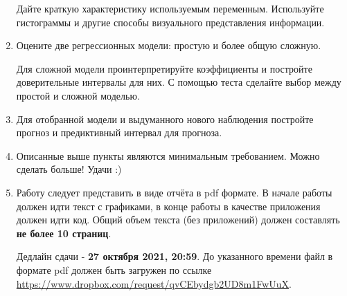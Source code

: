 \documentclass[12pt]{article}
\begin{document}
\begin{enumerate}
Дайте краткую характеристику используемым переменным. Используйте гистограммы и другие способы визуального представления информации.

\item Оцените две регрессионных модели: простую и более общую сложную. 

Для сложной модели проинтерпретируйте коэффициенты и постройте доверительные интервалы для них. С помощью теста сделайте выбор между простой и сложной моделью. 

\item Для отобранной модели и выдуманного нового наблюдения постройте прогноз и предиктивный интервал для прогноза.  



\item Описанные выше пункты являются минимальным требованием. Можно сделать больше! Удачи :)

\item Работу следует представить в виде отчёта в pdf формате. В начале работы должен идти текст с графиками, в конце работы в качестве приложения должен идти код. Общий объем текста (без приложений) должен составлять \textbf{не более 10 страниц}.


Дедлайн сдачи - \textbf{27 октября 2021, 20:59}. До указанного времени файл в формате pdf должен быть загружен по ссылке
\url{https://www.dropbox.com/request/qvCEbydgb2UD8m1FwUuX}.

\end{enumerate}
\end{document}
